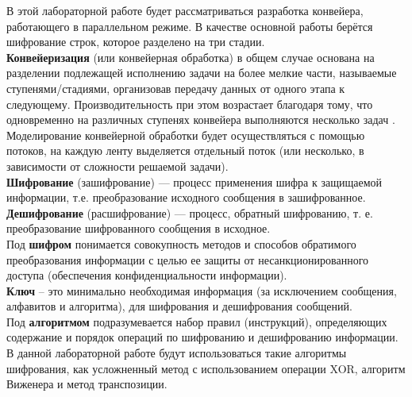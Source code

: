 В этой лабораторной работе будет рассматриваться разработка конвейера, работающего в параллельном режиме. В качестве основной работы берётся шифрование строк, которое разделено на три стадии. \\

\textbf{Конвейеризация} (или конвейерная обработка) в общем случае основана на разделении подлежащей исполнению задачи на более мелкие части, называемые ступенями/стадиями, организовав передачу данных от одного этапа к следующему.  Производительность при этом возрастает благодаря тому, что одновременно на различных ступенях конвейера выполняются несколько задач \cite{Conveyor}.\\

Моделирование конвейерной обработки будет осуществляться с помощью потоков, на каждую ленту выделяется отдельный поток (или несколько, в зависимости от сложности решаемой задачи).\\

\textbf{Шифрование} (зашифрование) — процесс применения шифра к защищаемой информации, т.е. преобразование исходного сообщения в зашифрованное.\\

\textbf{Дешифрование} (расшифрование) — процесс, обратный шифрованию, т. е. преобразование шифрованного сообщения в исходное.\\

Под \textbf{шифром} понимается совокупность методов и способов обратимого преобразования информации с целью ее защиты от несанкционированного доступа (обеспечения конфиденциальности информации).\\

\textbf{Ключ} – это минимально необходимая информация (за исключением сообщения, алфавитов и алгоритма), для шифрования и дешифрования сообщений.\\

Под \textbf{алгоритмом} подразумевается набор правил (инструкций), определяющих содержание и порядок операций по шифрованию и дешифрованию информации.\\

В данной лабораторной работе будут использоваться такие алгоритмы шифрования, как усложненный метод с использованием операции XOR, алгоритм Виженера и метод транспозиции. 














